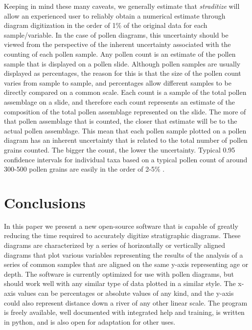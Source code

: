 \begin{refsection}
Keeping in mind these many caveats, we generally estimate that \emph{straditize} will allow an experienced user to reliably obtain a numerical estimate through diagram digitization in the order of 1\% of the original data for each sample/variable. In the case of pollen diagrams, this uncertainty should be viewed from the perspective of the inherent uncertainty associated with the counting of each pollen sample. Any pollen count is an estimate of the pollen sample that is displayed on a pollen slide. Although pollen samples are usually displayed as percentages, the reason for this is that the size of the pollen count varies from sample to sample, and percentages allow different samples to be directly compared on a common scale. Each count is a sample of the total pollen assemblage on a slide, and therefore each count represents an estimate of the composition of the total pollen assemblage represented on the slide. The more of that pollen assemblage that is counted, the closer that estimate will be to the actual pollen assemblage. This mean that each pollen sample plotted on a pollen diagram has an inherent uncertainty that is related to the total number of pollen grains counted. The bigger the count, the lower the uncertainty. Typical 0.95 confidence intervals for individual taxa based on a typical pollen count of around 300-500 pollen grains are easily in the order of 2-5\% \citep{Maher1972}.

\section{Conclusions}  \label{sec:straditize-conclusions}
In this paper we present a new open-source software that is capable of greatly reducing the time required to accurately digitize stratigraphic diagrams. These diagrams are characterized by a series of horizontally or vertically aligned diagrams that plot various variables representing the results of the analysis of a series of common samples that are aligned on the same y-axis representing age or depth. The software is currently optimized for use with pollen diagrams, but should work well with any similar type of data plotted in a similar style. The x-axis values can be percentages or absolute values of any kind, and the y-axis could also represent distance down a river of any other linear scale. The program is freely available, well documented with integrated help and training, is written in python, and is also open for adaptation for other uses. 

\printbibliography[heading=subbibintoc]

\end{refsection}